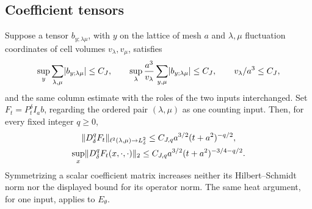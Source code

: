 \subsection{Coefficient tensors}

\begin{lemma}\label{ch23:lem:pair-schur}
Suppose a tensor $b_{y;\lambda\mu}$, with $y$ on the lattice of mesh $a$ and $\lambda,\mu$ fluctuation coordinates of cell volumes $v_\lambda,v_\mu$, satisfies
\[
 \sup_y\sum_{\lambda,\mu}\lvert b_{y;\lambda\mu}\rvert\le C_J,
 \qquad
 \sup_\lambda\frac{a^3}{v_\lambda}\sum_{y,\mu}\lvert b_{y;\lambda\mu}\rvert\le C_J,
 \qquad v_\lambda/a^3\le C_J,
\]
and the same column estimate with the roles of the two inputs interchanged. Set $F_t=P_t^\delta I_ab$, regarding the ordered pair $(\lambda,\mu)$ as one counting input. Then, for every fixed integer $q\ge0$,
\begin{gather*}
 \lVert D_\delta^qF_t\rVert_{\ell^2(\lambda,\mu)\to L_\delta^2}\le C_{J,q}a^{3/2}(t+a^2)^{-q/2},\\
 \sup_x\lVert D_\delta^qF_t(x,\cdot,\cdot)\rVert_2\le C_{J,q}a^{3/2}(t+a^2)^{-3/4-q/2}.
\end{gather*}
Symmetrizing a scalar coefficient matrix increases neither its Hilbert--Schmidt norm nor the displayed bound for its operator norm. The same heat argument, for one input, applies to $E_\theta$.
\end{lemma}

